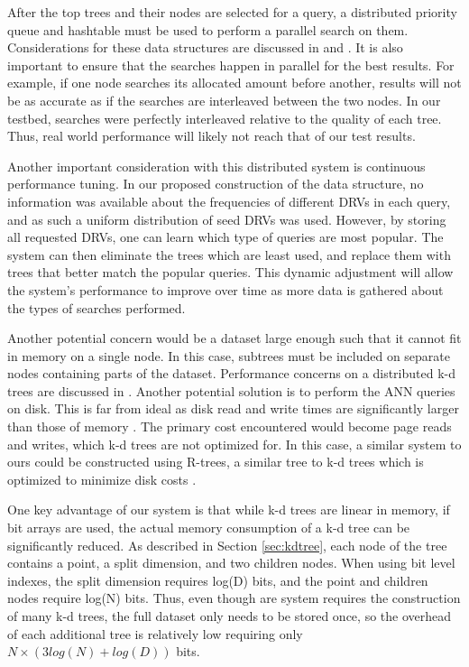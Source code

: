 After the top trees and their nodes are selected for a query, a distributed priority queue and hashtable must be used to perform a parallel search on them.  Considerations for these data structures are discussed in \citep{kaashoek2003koorde} and \citep{rogers1995supporting}.  It is also important to ensure that the searches happen in parallel for the best results.  For example, if one node searches its allocated amount before another, results will not be as accurate as if the searches are interleaved between the two nodes.  In our testbed, searches were perfectly interleaved relative to the quality of each tree.  Thus, real world performance will likely not reach that of our test results.

Another important consideration with this distributed system is continuous performance tuning.  In our proposed construction of the data structure, no information was available about the frequencies of different DRVs in each query, and as such a uniform distribution of seed DRVs was used.  However, by storing all requested DRVs, one can learn which type of queries are most popular.  The system can then eliminate the trees which are least used, and replace them with trees that better match the popular queries.  This dynamic adjustment will allow the system's performance to improve over time as more data is gathered about the types of searches performed.

Another potential concern would be a dataset large enough such that it cannot fit in memory on a single node.  In this case, subtrees must be included on separate nodes containing parts of the dataset.  Performance concerns on a distributed k-d trees are discussed in \citep{aly2011distributed}.  Another potential solution is to perform the ANN queries on disk.  This is far from ideal as disk read and write times are significantly larger than those of memory \citep{karedla1994caching}.  The primary cost encountered would become page reads and writes, which k-d trees are not optimized for.  In this case, a similar system to ours could be constructed using R-trees, a similar tree to k-d trees which is optimized to minimize disk costs \citep{guttman1984r}.

One key advantage of our system is that while k-d trees are linear in memory, if bit arrays are used, the actual memory consumption of a k-d tree can be significantly reduced.  As described in Section \ref{sec:kdtree}, each node of the tree contains a point, a split dimension, and two children nodes.  When using bit level indexes, the split dimension requires log(D) bits, and the point and children nodes require log(N) bits.  Thus, even though are system requires the construction of many k-d trees, the full dataset only needs to be stored once, so the overhead of each additional tree is relatively low requiring only $N \times (3log(N) + log(D))$ bits.

